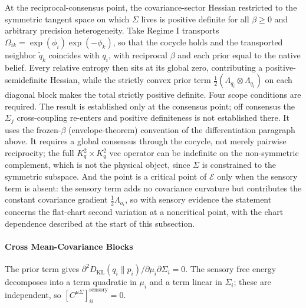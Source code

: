 At the reciprocal-consensus point, the covariance-sector Hessian restricted to the symmetric tangent space on which $\Sigma$ lives is positive definite for all $\beta \geq 0$ and arbitrary precision heterogeneity. Take Regime I transports $\Omega_{ik} = \exp(\phi_i)\exp(-\phi_k)$, so that the cocycle holds and the transported neighbor $\tilde{q}_k$ coincides with $q_i$, with reciprocal $\beta$ and each prior equal to the native belief. Every relative entropy then sits at its global zero, contributing a positive-semidefinite Hessian, while the strictly convex prior term $\frac{1}{2}(\Lambda_{q_i} \otimes \Lambda_{q_i})$ on each diagonal block makes the total strictly positive definite. Four scope conditions are required. The result is established only at the consensus point; off consensus the $\Sigma_j$ cross-coupling re-enters and positive definiteness is not established there. It uses the frozen-$\beta$ (envelope-theorem) convention of the differentiation paragraph above. It requires a global consensus through the cocycle, not merely pairwise reciprocity; the full $K_q^2 \times K_q^2$ vec operator can be indefinite on the non-symmetric complement, which is not the physical object, since $\Sigma$ is constrained to the symmetric subspace. And the point is a critical point of $\mathcal{E}$ only when the sensory term is absent: the sensory term adds no covariance curvature but contributes the constant covariance gradient $\tfrac12\Lambda_{o_i}$, so with sensory evidence the statement concerns the flat-chart second variation at a noncritical point, with the chart dependence described at the start of this subsection.

\paragraph{Cross Mean-Covariance Blocks}

The prior term gives $\partial^2 D_{\mathrm{KL}}(q_i \| p_i)/\partial \mu_i \partial \Sigma_i = 0$. The sensory free energy decomposes into a term quadratic in $\mu_i$ and a term linear in $\Sigma_i$; these are independent, so $[C^{\mu\Sigma}]_{ii}^{\mathrm{sensory}} = 0$.

